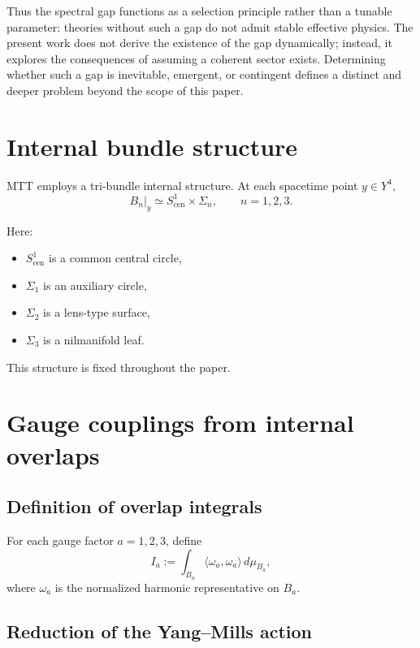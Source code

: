 \documentclass[11pt]{article}
\begin{document}
Thus the spectral gap functions as a selection principle rather than a tunable
parameter: theories without such a gap do not admit stable effective physics.
The present work does not derive the existence of the gap dynamically; instead,
it explores the consequences of assuming a coherent sector exists.
Determining whether such a gap is inevitable, emergent, or contingent defines a
distinct and deeper problem beyond the scope of this paper.

\section{Internal bundle structure}

MTT employs a tri-bundle internal structure.
At each spacetime point $y\in Y^4$,
\[
B_n|_y \simeq S^1_{\mathrm{cen}} \times \Sigma_n,
\qquad n=1,2,3.
\]

Here:
\begin{itemize}
\item $S^1_{\mathrm{cen}}$ is a common central circle,
\item $\Sigma_1$ is an auxiliary circle,
\item $\Sigma_2$ is a lens-type surface,
\item $\Sigma_3$ is a nilmanifold leaf.
\end{itemize}

This structure is fixed throughout the paper.

\section{Gauge couplings from internal overlaps}

\subsection{Definition of overlap integrals}

\begin{definition}
For each gauge factor $a=1,2,3$, define
\[
I_a := \int_{B_a} \langle \omega_a, \omega_a \rangle \, d\mu_{B_a},
\]
where $\omega_a$ is the normalized harmonic representative on $B_a$.
\end{definition}

\subsection{Reduction of the Yang--Mills action}
\end{document}
